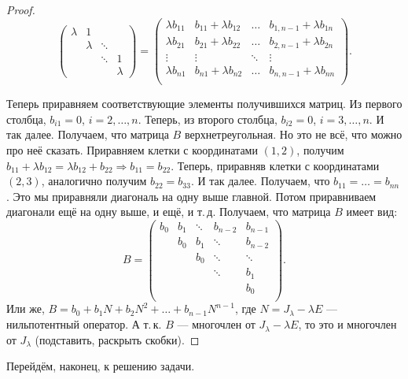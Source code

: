 \begin{proof}
\[\begin{pmatrix}
        \lambda & 1 & & \\
         & \lambda & \ddots & \\
         & & \ddots & 1 \\
         & & & \lambda
    \end{pmatrix} =
    \begin{pmatrix}
        \lambda b_{11} & b_{11} + \lambda b_{12} & \ldots & b_{1, n - 1} + \lambda b_{1n}\\
        \lambda b_{21} & b_{21} + \lambda b_{22} & \ldots & b_{2, n - 1} + \lambda b_{2n}\\
        \vdots & \vdots & \ddots & \vdots\\
        \lambda b_{n1} & b_{n1} + \lambda b_{n2} & \ldots & b_{n, n - 1} + \lambda b_{nn}\\
    \end{pmatrix}.
    \]

    Теперь приравняем соответствующие элементы получившихся матриц. Из первого столбца, $b_{i1} = 0$, $i = 2, \ldots, n$. Теперь, из второго столбца, $b_{i2} = 0$, $i = 3, \ldots, n$. И так далее. Получаем, что матрица $B$ верхнетреугольная. Но это не всё, что можно про неё сказать. Приравняем клетки с координатами $(1, 2)$, получим $b_{11} + \lambda b_{12} = \lambda b_{12} + b_{22} \Rightarrow b_{11} = b_{22}$. Теперь, приравняв клетки с координатами $(2, 3)$, аналогично получим $b_{22} = b_{33}$. И так далее. Получаем, что $b_{11} = \ldots = b_{nn}$. Это мы приравняли диагональ на одну выше главной. Потом приравниваем диагонали ещё на одну выше, и ещё, и т.\,д. Получаем, что матрица $B$ имеет вид:
    \[
        B =
        \begin{pmatrix}
            b_0 & b_1 & \ddots & b_{n - 2} & b_{n - 1}\\
                & b_0 & b_1 & \ddots & b_{n - 2}\\
                &     & b_0    & \ddots & \ddots\\
                &     &        & \ddots & b_1\\
                &     &        &        & b_0\\
        \end{pmatrix}.
    \]
    Или же, $B = b_0 + b_1N + b_2N^2 + \ldots + b_{n - 1}N^{n - 1}$, где $N = J_\lambda - \lambda E$ --- нильпотентный оператор. А т.\,к. $B$ --- многочлен от $J_\lambda - \lambda E$, то это и многочлен от $J_\lambda$ (подставить, раскрыть скобки).
\end{proof}

Перейдём, наконец, к решению задачи.

